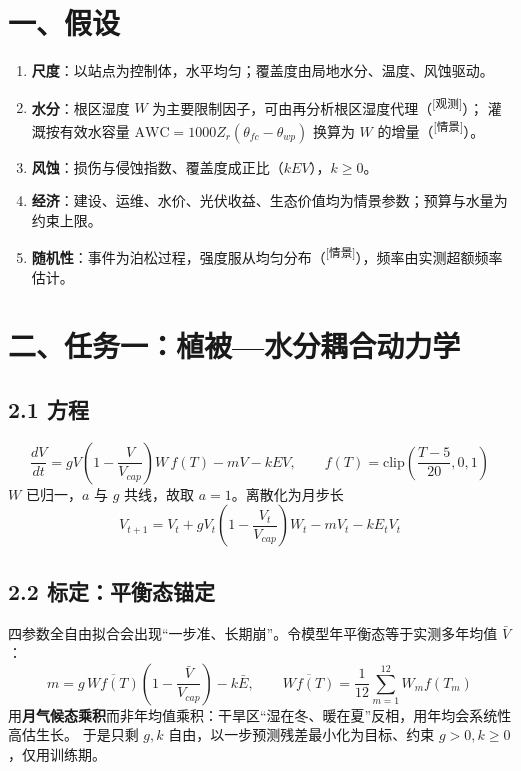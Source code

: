 \documentclass[11pt,a4paper]{ctexart}
\newcommand{\src}[1]{\textsuperscript{\scriptsize [#1]}}
\begin{document}
\section*{一、假设}
\begin{enumerate}
\item \textbf{尺度}：以站点为控制体，水平均匀；覆盖度由局地水分、温度、风蚀驱动。
\item \textbf{水分}：根区湿度 $W$ 为主要限制因子，可由再分析根区湿度代理（\src{观测}）；
灌溉按有效水容量 $\mathrm{AWC}=1000Z_r(\theta_{fc}-\theta_{wp})$ 换算为 $W$ 的增量（\src{情景}）。
\item \textbf{风蚀}：损伤与侵蚀指数、覆盖度成正比（$kEV$），$k\ge0$。
\item \textbf{经济}：建设、运维、水价、光伏收益、生态价值均为情景参数；预算与水量为约束上限。
\item \textbf{随机性}：事件为泊松过程，强度服从均匀分布（\src{情景}），频率由实测超额频率估计。
\end{enumerate}

\section*{二、任务一：植被—水分耦合动力学}
\subsection*{2.1 方程}
\begin{equation}
\frac{dV}{dt}=gV\left(1-\frac{V}{V_{cap}}\right)W\,f(T)-mV-kEV,
\qquad f(T)=\mathrm{clip}\!\left(\frac{T-5}{20},0,1\right)
\end{equation}
$W$ 已归一，$a$ 与 $g$ 共线，故取 $a=1$。离散化为月步长
\begin{equation}
V_{t+1}=V_t+gV_t\left(1-\frac{V_t}{V_{cap}}\right)W_t-mV_t-kE_tV_t
\end{equation}

\subsection*{2.2 标定：平衡态锚定}
四参数全自由拟合会出现“一步准、长期崩”。令模型年平衡态等于实测多年均值 $\bar V$：
\begin{equation}
m=g\,\overline{Wf(T)}\left(1-\frac{\bar V}{V_{cap}}\right)-k\bar E,\qquad
\overline{Wf(T)}=\frac{1}{12}\sum_{m=1}^{12}W_m f(T_m)
\end{equation}
用\textbf{月气候态乘积}而非年均值乘积：干旱区“湿在冬、暖在夏”反相，用年均会系统性高估生长。
于是只剩 $g,k$ 自由，以一步预测残差最小化为目标、约束 $g>0,k\ge0$，仅用训练期。
\end{document}
